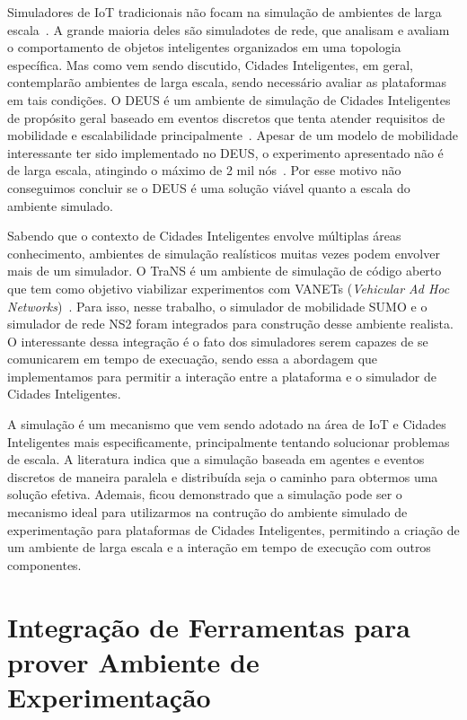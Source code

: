 Simuladores de IoT tradicionais não focam na simulação de ambientes de larga escala~\cite{brambilla_2014}.
A grande maioria deles são simuladotes de rede, que analisam e avaliam o comportamento de objetos inteligentes organizados em uma topologia específica.
Mas como vem sendo discutido, Cidades Inteligentes, em geral, contemplarão ambientes de larga escala, sendo necessário avaliar as plataformas em tais condições.
O DEUS é um ambiente de simulação de Cidades Inteligentes de propósito geral baseado em eventos discretos que tenta atender requisitos de mobilidade e escalabilidade principalmente~\cite{picone_2012}.
Apesar de um modelo de mobilidade interessante ter sido implementado no DEUS, o experimento apresentado não é de larga escala, atingindo o máximo de 2 mil nós~\cite{picone_2012}.
Por esse motivo não conseguimos concluir se o DEUS é uma solução viável quanto a escala do ambiente simulado.

Sabendo que o contexto de Cidades Inteligentes envolve múltiplas áreas conhecimento, ambientes de simulação realísticos muitas vezes podem envolver mais de um simulador.
O TraNS é um ambiente de simulação de código aberto que tem como objetivo viabilizar experimentos com VANETs (\textit{Vehicular Ad Hoc Networks})~\cite{piorkowski_2008}.
Para isso, nesse trabalho, o simulador de mobilidade SUMO e o simulador de rede NS2 foram integrados para construção desse ambiente realista.
O interessante dessa integração é o fato dos simuladores serem capazes de se comunicarem em tempo de execuação, sendo essa a abordagem que implementamos para permitir a interação entre a plataforma
e o simulador de Cidades Inteligentes.

A simulação é um mecanismo que vem sendo adotado na área de IoT e Cidades Inteligentes mais especificamente, principalmente tentando solucionar problemas de escala.
A literatura indica que a simulação baseada em agentes e eventos discretos de maneira paralela e distribuída seja o caminho para obtermos uma solução efetiva.
Ademais, ficou demonstrado que a simulação pode ser o mecanismo ideal para utilizarmos na contrução do ambiente simulado de experimentação para plataformas de Cidades Inteligentes, permitindo a criação
de um ambiente de larga escala e a interação em tempo de execução com outros componentes.

\section{Integração de Ferramentas para prover Ambiente de Experimentação}




